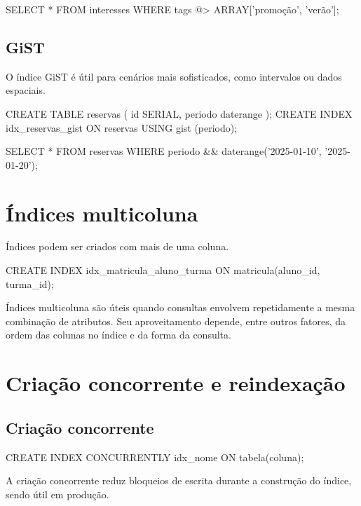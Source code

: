 \begin{sqlcode}
SELECT *
FROM interesses
WHERE tags @> ARRAY['promoção', 'verão'];
\end{sqlcode}

\subsection{GiST}

O índice GiST é útil para cenários mais sofisticados, como intervalos ou dados espaciais.

\begin{sqlcode}
CREATE TABLE reservas (
    id SERIAL,
    periodo daterange
);
CREATE INDEX idx_reservas_gist
ON reservas USING gist (periodo);
\end{sqlcode}

\begin{sqlcode}
SELECT *
FROM reservas
WHERE periodo && daterange('2025-01-10', '2025-01-20');
\end{sqlcode}

\section{Índices multicoluna}

Índices podem ser criados com mais de uma coluna.

\begin{sqlcode}
CREATE INDEX idx_matricula_aluno_turma
ON matricula(aluno_id, turma_id);
\end{sqlcode}

Índices multicoluna são úteis quando consultas envolvem repetidamente a mesma combinação de atributos. Seu aproveitamento depende, entre outros fatores, da ordem das colunas no índice e da forma da consulta.

\section{Criação concorrente e reindexação}

\subsection{Criação concorrente}

\begin{sqlcode}
CREATE INDEX CONCURRENTLY idx_nome ON tabela(coluna);
\end{sqlcode}

A criação concorrente reduz bloqueios de escrita durante a construção do índice, sendo útil em produção.

